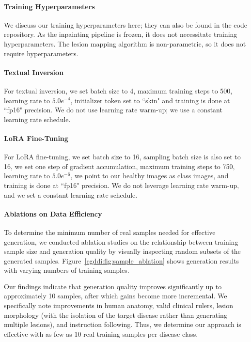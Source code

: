 \documentclass[11pt]{ucthesis}
\begin{document}
\paragraph{Training Hyperparameters}

We discuss our training hyperparameters here; they can also be found in the code repository. As the inpainting pipeline is frozen, it does not necessitate training hyperparameters. The lesion mapping algorithm is non-parametric, so it does not require hyperparameters.

\paragraph{Textual Inversion}
For textual inversion, we set batch size to 4, maximum training steps to 500, learning rate to $5.0e^{-4}$, initializer token set to ``skin" and training is done at ``fp16" precision. We do not use learning rate warm-up; we use a constant learning rate schedule.

\paragraph{LoRA Fine-Tuning}
For LoRA fine-tuning, we set batch size to 16, sampling batch size is also set to 16, we set one step of gradient accumulation, maximum training steps to 750, learning rate to $5.0e^{-6}$, we point to our healthy images as class images, and training is done at ``fp16" precision. We do not leverage learning rate warm-up, and we set a constant learning rate schedule.

\paragraph{Ablations on Data Efficiency}
To determine the minimum number of real samples needed for effective generation, we conducted ablation studies on the relationship between training sample size and generation quality by visually inspecting random subsets of the generated samples. Figure~\ref{cgddi:fig:sample_ablation} shows generation results with varying numbers of training samples.

Our findings indicate that generation quality improves significantly up to approximately 10 samples, after which gains become more incremental. We specifically note improvements in human anatomy, valid clinical rulers, lesion morphology (with the isolation of the target disease rather than generating multiple lesions), and instruction following. Thus, we determine our approach is effective with as few as 10 real training samples per disease class.
\end{document}
